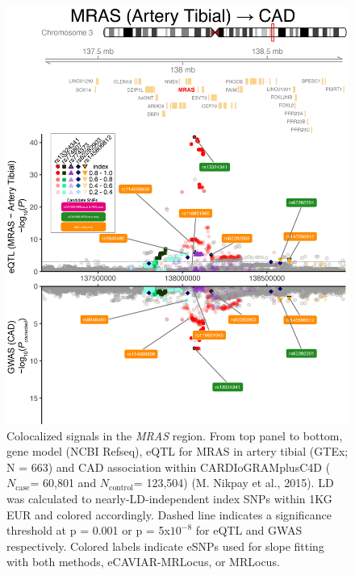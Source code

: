 \documentclass[11pt]{article}
\newcommand{\Ncase}{$N_{\textrm{case}}$\xspace}
\newcommand{\Ncontrol}{$N_{\textrm{control}}$\xspace}
\begin{document}
\begin{figure}[!ht]
  \centering
  \includegraphics[width=.7\textwidth]{figs/region/regionplot.MRAS_Artery_Tibial_CAD.20210114.edit.png}
  \caption{Colocalized signals in the \emph{MRAS} region. From top
    panel to bottom, gene model (NCBI Refseq), eQTL for MRAS in artery
    tibial (GTEx; N = 663) and CAD association within
    CARDIoGRAMplusC4D (\Ncase = 60,801 and \Ncontrol = 123,504)
    (M. Nikpay et al., 2015). LD was calculated to
    nearly-LD-independent index SNPs within 1KG EUR and colored
    accordingly. Dashed line indicates a significance threshold at p =
    0.001 or p = 5x$10^{-8}$ for eQTL and GWAS respectively.
    Colored labels indicate eSNPs used for slope fitting with both
    methods, eCAVIAR-MRLocus, or MRLocus.}
\end{figure}
\end{document}
